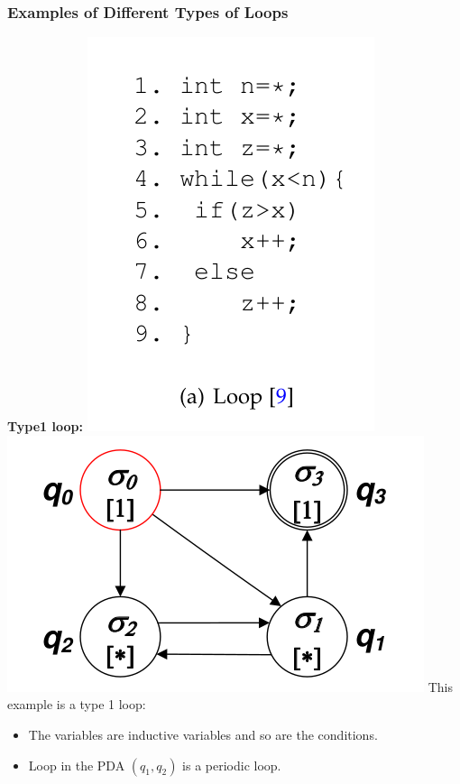 \documentclass[11pt]{beamer}
\begin{document}
\begin{frame}\frametitle{Examples of Different Types of Loops}
\begin{multicols}{2}

\textbf{Type1 loop:}
\includegraphics[scale=0.3]{type1exp.png}
\includegraphics[scale=0.3]{type1pda.png}
This example is a type 1 loop:
\begin{itemize}
\item The variables are inductive variables and so are the conditions.
\item Loop in the PDA $(q_1, q_2)$ is a periodic loop.
\end{itemize}
\end{multicols}
\end{frame}
\end{document}
